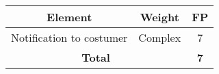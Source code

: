 \begin{center}
\begin{tabular}{|c|c|c|}
\hline
\multicolumn{1}{|c|}{\textbf{Element}} & \multicolumn{1}{c|}{\textbf{Weight}} & \multicolumn{1}{c|}{\textbf{FP}}\\
\hline
Notification to costumer &Complex &7\\
\hline
\multicolumn{2}{|c|}{\textbf{Total}} & \multicolumn{1}{c|}{\textbf{7}}\\
\hline
\end{tabular}
\end{center}

